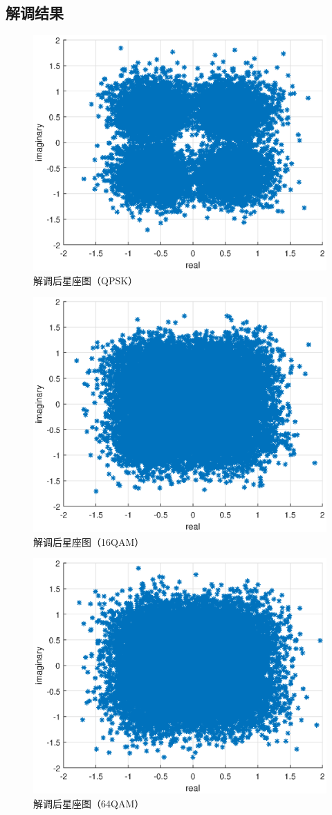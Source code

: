 \documentclass{article}
\begin{document}
\subsection{解调结果}
\begin{figure}[H]
	\centering
	\includegraphics[width = .8\textwidth]{u2.eps}
	\caption{解调后星座图（QPSK）}
\end{figure}
\begin{figure}[H]
	\centering
	\includegraphics[width = .8\textwidth]{u3.eps}
	\caption{解调后星座图（16QAM）}
\end{figure}
\begin{figure}[H]
	\centering
	\includegraphics[width = .8\textwidth]{u4.eps}
	\caption{解调后星座图（64QAM）}
\end{figure}
\end{document}
